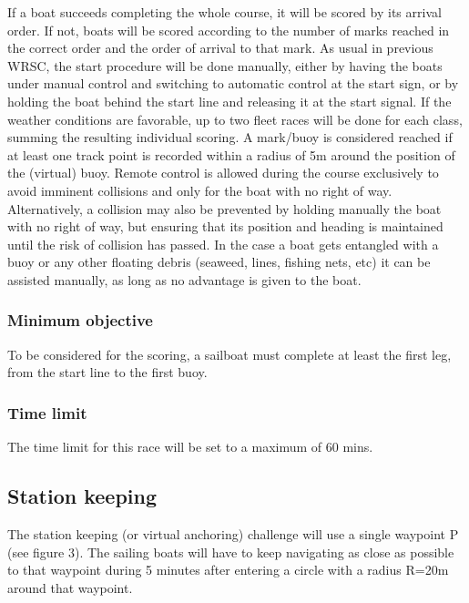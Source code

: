 \documentclass[12pt]{article}
\begin{document}
If a boat succeeds completing the whole course, it will be scored by its arrival
order. If not,
boats will be scored according to the number of marks reached in the correct
order and the
order of arrival to that mark. As usual in previous WRSC, the start procedure
will be done
manually, either by having the boats under manual control and switching to
automatic control
at the start sign, or by holding the boat behind the start line and releasing it
at the start signal.
If the weather conditions are favorable, up to two fleet races will be done for
each class,
summing the resulting individual scoring. A mark/buoy is considered reached if
at least one
track point is recorded within a radius of 5m around the position of the
(virtual) buoy.
Remote control is allowed during the course exclusively to avoid imminent
collisions and only
for the boat with no right of way. Alternatively, a collision may also be
prevented by holding
manually the boat with no right of way, but ensuring that its position and
heading is maintained
until the risk of collision has passed. In the case a boat gets entangled with a
buoy or any other
floating debris (seaweed, lines, fishing nets, etc) it can be assisted manually,
as long as no
advantage is given to the boat.

\subsubsection{Minimum objective}
To be considered for the scoring, a sailboat must complete at least the first
leg, from the start
line to the first buoy.

\subsubsection{Time limit}

The time limit for this race will be set to a maximum of 60 mins.

\subsection{Station keeping}
The station keeping (or virtual anchoring) challenge will use a single waypoint P
(see figure 3).
The sailing boats will have to keep navigating as close as possible to that
waypoint during 5
minutes after entering a circle with a radius R=20m around that waypoint.
\end{document}
